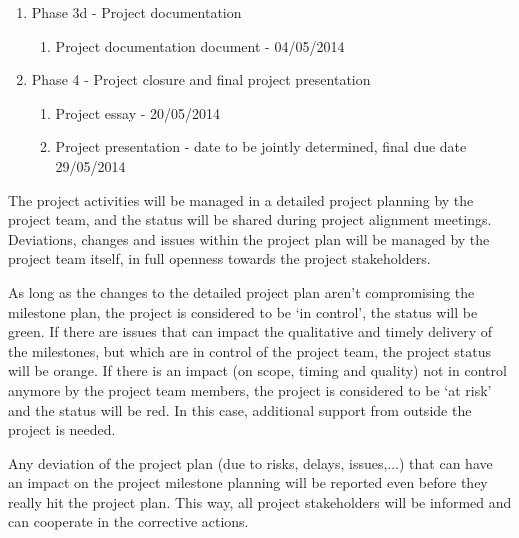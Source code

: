 \begin{enumerate}
 	\item Phase 3d - Project documentation
 	\begin{enumerate}
		\item Project documentation document				- 	04/05/2014
	\end {enumerate}
	\item Phase 4 - Project closure and final project presentation
 	\begin{enumerate}
		\item Project essay							- 	20/05/2014
		\item Project presentation						- 	date to be jointly determined, final due date 29/05/2014
	\end {enumerate}
\end {enumerate}

\noindent
The project activities will be managed in a detailed project planning by the project team, and the status will be shared during project alignment meetings.
Deviations, changes and issues within the project plan will be managed by the project team itself, in full openness towards the project stakeholders.

As long as the changes to the detailed project plan aren't  compromising the milestone plan, the project is considered to be `in control', the status will be green.
If there are issues that can impact the qualitative and timely delivery of the milestones, but which are in control of the project team, the project status will be orange.
If there is an impact (on scope, timing and quality) not in control anymore by the project team members, the project is considered to be `at risk' and the status will be red.
In this case, additional support from outside the project is needed.

Any deviation of the project plan (due to risks, delays, issues,...) that can have an impact on the project milestone planning will be reported even before they really hit the project plan.
This way, all project stakeholders will be informed and can cooperate in the corrective actions.





